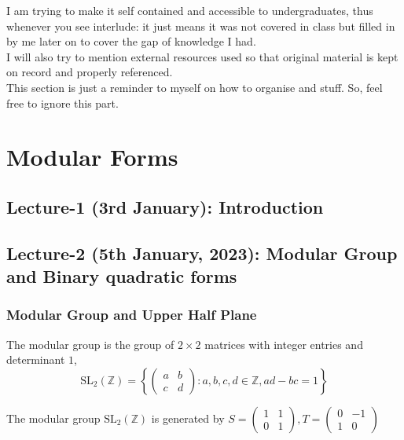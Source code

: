 \documentclass[oneside, 12pt]{scrbook}
\newcommand{\ZZ}{\mathbb Z}
\newcommand{\SL}{\mathrm{SL}}
\newcommand{\ds}{\displaystyle}
\theoremstyle{theorem}
\begin{document}
I am trying to make it self contained and accessible to undergraduates, thus whenever you see interlude: it just means it was not covered in class but filled in by me later on to cover the gap of knowledge I had. \\

I will also try to mention external resources used so that original material is kept on record and properly referenced. \\

This section is just a reminder to myself on how to organise and stuff. So, feel free to ignore this part. 

\tableofcontents

\mainmatter

\part{Modular Forms}

\chapter{Lecture-1 (3rd January): Introduction }

\chapter{Lecture-2 (5th January, 2023): Modular Group and Binary quadratic forms}

\section{Modular Group and Upper Half Plane}

The modular group is the group of $2\times 2$ matrices with integer entries and determinant $1$, 
\begin{equation}
\SL_{2}(\ZZ) = \left\{ \begin{pmatrix}
a & b \\ c & d
\end{pmatrix} : a,b,c,d \in \ZZ , ad-bc=1\right\}
\end{equation}

\begin{proposition}[DS, exercise 1.1.1]
The modular group $\SL_{2}(\ZZ)$ is generated by $\ds{S = \begin{pmatrix}
1 & 1 \\ 0 & 1
\end{pmatrix} , T = \begin{pmatrix}
0 & -1 \\ 1 & 0
\end{pmatrix}}$
\end{proposition}
\end{document}
